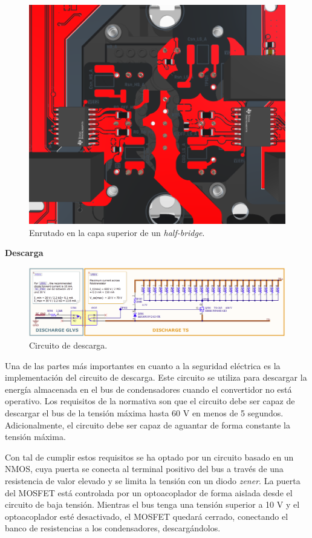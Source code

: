 \begin{figure}[H]
	\centering
	\includegraphics[width=0.7\linewidth]{fig/invPowerRouting}
	\caption{Enrutado en la capa superior de un \textit{half-bridge}.}
\end{figure}



\textbf{Descarga}
\begin{figure}[H]
	\centering
	\includegraphics[width=0.9\linewidth]{fig/discharge-sch}
	\caption{Circuito de descarga.}
\end{figure}

Una de las partes más importantes en cuanto a la seguridad eléctrica es la implementación del circuito de descarga. Este circuito se utiliza para descargar la energía almacenada en el bus de condensadores cuando el convertidor no está operativo. Los requisitos de la normativa son que el circuito debe ser capaz de descargar el bus de la tensión máxima hasta 60 V en menos de 5 segundos. Adicionalmente, el circuito debe ser capaz de aguantar de forma constante la tensión máxima.

Con tal de cumplir estos requisitos se ha optado por un circuito basado en un NMOS, cuya puerta se conecta al terminal positivo del bus a través de una resistencia de valor elevado y se limita la tensión con un diodo \textit{zener}. La puerta del MOSFET está controlada por un optoacoplador de forma aislada desde el circuito de baja tensión. Mientras el bus tenga una tensión superior a 10 V y el optoacoplador esté desactivado, el MOSFET quedará cerrado, conectando el banco de resistencias a los condensadores, descargándolos.

